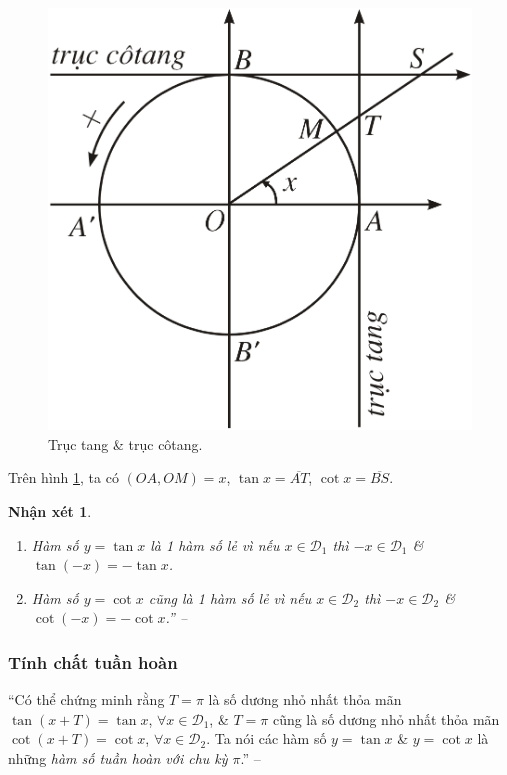 \documentclass[oneside]{book}
\numberwithin{equation}{section}
\newtheorem{nhanxet}{Nhận xét}[section]
\begin{document}
\begin{itemize}
	\begin{figure}[H]
		\centering
		\includegraphics[scale=0.15]{truc_tan_truc_cot}
		\caption{Trục tang \& trục côtang.}
		\label{fig:truc tan truc cot}
	\end{figure}
	Trên hình \ref{fig:truc tan truc cot}, ta có $(OA,OM) = x$, $\tan x = \overline{AT}$, $\cot x = \overline{BS}$.
	
	\begin{nhanxet}
		\begin{enumerate}
			\item Hàm số $y = \tan x$ là 1 \emph{hàm số lẻ} vì nếu $x\in\mathcal{D}_1$ thì $-x\in\mathcal{D}_1$ \& $\tan(-x) = -\tan x$.
			\item Hàm số $y = \cot x$ cũng là 1 \emph{hàm số lẻ} vì nếu $x\in\mathcal{D}_2$ thì $-x\in\mathcal{D}_2$ \& $\cot(-x) = -\cot x$.'' -- \cite[pp. 9--10]{SGK_Toan_11_dai_so_giai_tich_nang_cao}
		\end{enumerate}
	\end{nhanxet}	
\end{itemize}

\subsubsection{Tính chất tuần hoàn}
``Có thể chứng minh rằng $T = \pi$ là số dương nhỏ nhất thỏa mãn $\tan(x + T) = \tan x$, $\forall x\in\mathcal{D}_1$, \& $T = \pi$ cũng là số dương nhỏ nhất thỏa mãn $\cot(x + T) = \cot x$, $\forall x\in\mathcal{D}_2$. Ta nói các hàm số $y = \tan x$ \& $y = \cot x$ là những \textit{hàm số tuần hoàn với chu kỳ $\pi$}.'' -- \cite[p. 10]{SGK_Toan_11_dai_so_giai_tich_nang_cao}
\end{document}
